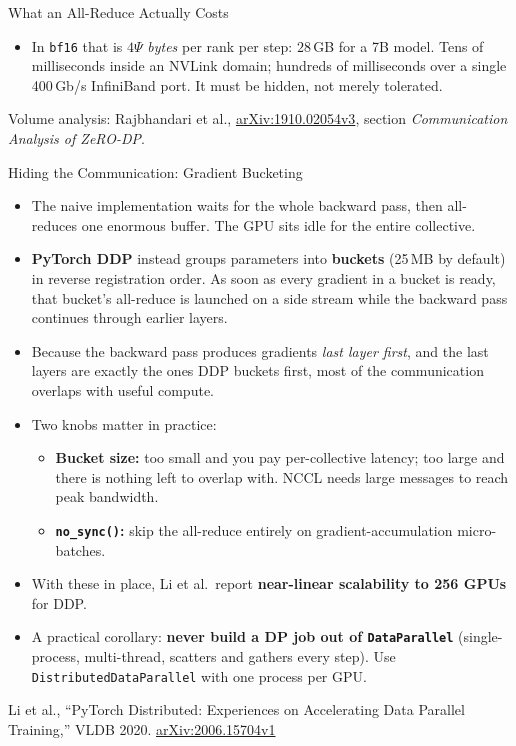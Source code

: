 \begin{frame}{What an All-Reduce Actually Costs}
\begin{itemize}
    \item[\textcolor{red}{$\blacktriangleright$}] In \texttt{bf16} that is $4\Psi$ \emph{bytes} per rank per step: $28$\,GB for a 7B model. Tens of milliseconds inside an NVLink domain; hundreds of milliseconds over a single 400\,Gb/s InfiniBand port. It must be hidden, not merely tolerated.
  \end{itemize}
  \vspace{0.1em}
  {\scriptsize Volume analysis: Rajbhandari et al., \href{https://arxiv.org/abs/1910.02054v3}{arXiv:1910.02054v3}, section \emph{Communication Analysis of ZeRO-DP}.}
\end{frame}

\begin{frame}[allowframebreaks]{Hiding the Communication: Gradient Bucketing}
  \begin{itemize}\itemsep0.4em
    \item[\textcolor{red}{$\blacktriangleright$}] The naive implementation waits for the whole backward pass, then all-reduces one enormous buffer. The GPU sits idle for the entire collective.
    \item[\textcolor{red}{$\blacktriangleright$}] \textbf{PyTorch DDP} instead groups parameters into \textbf{buckets} (25\,MB by default) in reverse registration order. As soon as every gradient in a bucket is ready, that bucket's all-reduce is launched on a side stream while the backward pass continues through earlier layers.
    \item[\textcolor{red}{$\blacktriangleright$}] Because the backward pass produces gradients \emph{last layer first}, and the last layers are exactly the ones DDP buckets first, most of the communication overlaps with useful compute.
    \item[\textcolor{red}{$\blacktriangleright$}] Two knobs matter in practice:
      \begin{itemize}\itemsep0.15em\footnotesize
        \item \textbf{Bucket size:} too small and you pay per-collective latency; too large and there is nothing left to overlap with. NCCL needs large messages to reach peak bandwidth.
        \item \textbf{\texttt{no\_sync()}:} skip the all-reduce entirely on gradient-accumulation micro-batches.
      \end{itemize}
    \item[\textcolor{red}{$\blacktriangleright$}] With these in place, Li et al.\ report \textbf{near-linear scalability to 256 GPUs} for DDP.
    \item[\textcolor{red}{$\blacktriangleright$}] A practical corollary: \textbf{never build a DP job out of \texttt{DataParallel}} (single-process, multi-thread, scatters and gathers every step). Use \texttt{DistributedDataParallel} with one process per GPU.
  \end{itemize}
  \vspace{0.1em}
  {\scriptsize Li et al., ``PyTorch Distributed: Experiences on Accelerating Data Parallel Training,'' VLDB 2020. \href{https://arxiv.org/abs/2006.15704v1}{arXiv:2006.15704v1}}
\end{frame}

